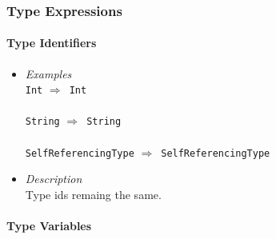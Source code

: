 \documentclass{article}
\def\lra{$\Longrightarrow$\ }
\begin{document}
\subsubsection{Type Expressions}

\paragraph{Type Identifiers}


\begin{itemize}
\item
\textit{Examples}\\

\verb|Int| \lra \verb|Int|\\\\
\verb|String| \lra \verb|String|\\\\
\verb|SelfReferencingType| \lra \verb|SelfReferencingType|\\
\item
\textit{Description}\\

Type ids remaing the same.

\end{itemize}

\paragraph{Type Variables}
\end{document}
